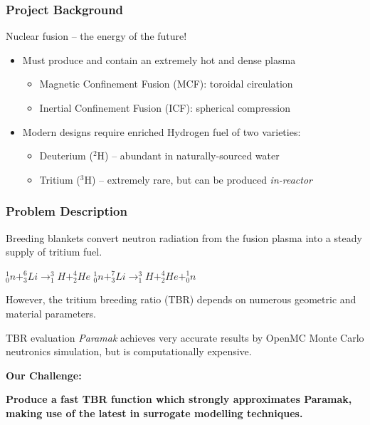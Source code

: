 
\begin{frame}
	\frametitle{Project Background}
	Nuclear fusion -- the energy of the future!
    \vspace{10pt}
	\begin{itemize}
	    \item Must produce and contain an extremely hot and dense plasma
	    \begin{itemize}
		    \item Magnetic Confinement Fusion (MCF): toroidal circulation
		    \item Inertial Confinement Fusion (ICF): spherical compression
		\end{itemize}
		\vspace{10pt}
		\item Modern designs require enriched Hydrogen fuel of two varieties:
	    \begin{itemize}
		    \item Deuterium ($^2$H) -- abundant in naturally-sourced water
		    \item Tritium ($^3$H) -- extremely rare, but can be produced \textit{in-reactor}
		\end{itemize}
	\end{itemize}
	\vspace{10pt}
\end{frame}

\begin{frame}
	\frametitle{Problem Description}
	Breeding blankets convert neutron radiation from the fusion plasma into a steady supply of tritium fuel.
	\begin{center}
	$^1_0n + ^6_3Li \rightarrow ^3_1H + ^4_2He$ \hspace{20pt} $^1_0n + ^7_3Li \rightarrow ^3_1H + ^4_2He + ^1_0n$
	\end{center}
	However, the tritium breeding ratio (TBR) depends on numerous geometric and material parameters.\newline
	
	TBR evaluation \textit{Paramak} achieves very accurate results by OpenMC Monte Carlo neutronics simulation, but is computationally expensive.
	
	\vspace{15pt}
	
	\begin{center}
	    \textbf{Our Challenge:}
	\end{center}
	
	\begin{center}
	    \textbf{Produce a fast TBR function which strongly approximates Paramak, making use of the latest in surrogate modelling techniques.}
	\end{center}
\end{frame}

